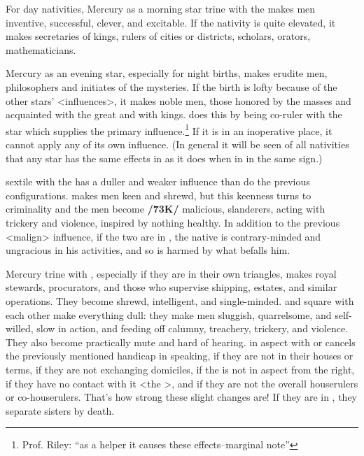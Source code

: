 For day nativities, Mercury \marginnote{\Mercury \Trine \Moon} as a morning star trine with the \Moon\xspace makes men inventive, successful, clever, and excitable. If the nativity is quite elevated, it makes secretaries of kings, rulers of cities or districts, scholars, orators, mathematicians.

Mercury as an evening star, especially for night births, makes erudite men, philosophers and initiates of the mysteries. If the birth is lofty because of the other stars’ <influences>, it makes noble men, those honored by the masses and acquainted with the great and with kings. \Mercury\xspace does this by being co-ruler with the star which supplies the primary influence.\footnote{Prof. Riley: ``as a helper it causes these effects--marginal note''}
If it is in an inoperative place, it cannot apply any of its own influence. (\mndl In general it will be seen of all nativities that any star has the same effects in \Trine\xspace as it does when in \Conjunction\xspace in the same sign.)

\Mercury\xspace sextile with the \Moon\xspace has a duller and weaker influence than do the previous configurations. \Mercury\xspace \Square\xspace makes men keen and shrewd, but this keenness turns to criminality and the men become \textbf{/73K/} malicious, slanderers, acting with trickery and violence, inspired by nothing healthy. In addition to the previous <malign> influence, if the two are in \Opposition, the native is contrary-minded and ungracious in his activities, and so is harmed by what befalls him.

Mercury \marginnote{\Mercury \Trine \Saturn} trine with \Saturn, especially if they are in their own triangles, makes royal stewards, procurators, and those who supervise shipping, estates, and similar operations. They become shrewd,
intelligent, and single-minded. \Mercury\xspace and \Saturn\xspace square with each other make everything dull: they make men sluggish, quarrelsome, and self-willed, slow in action, and feeding off calumny, treachery, trickery, and violence. They also become practically mute and hard of hearing. \Mars\xspace in aspect with \Saturn\xspace
or \Mercury\xspace cancels the previously mentioned handicap in speaking, if they are not in their houses or terms,
if they are not exchanging domiciles, if the \Moon\xspace is not in aspect from the right, if they have no contact with it <the \Moon>, and if they are not the overall houserulers or co-houserulers. \mndl That’s how strong these slight changes are! If they are in \Opposition, they separate sisters by death.


